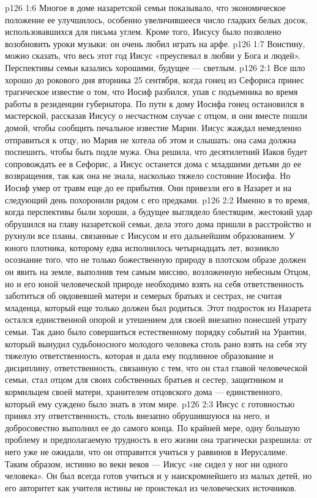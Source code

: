 \vs p126 1:6 Многое в доме назаретской семьи показывало, что экономическое положение ее улучшилось, особенно увеличившееся число гладких белых досок, использовавшихся для письма углем. Кроме того, Иисусу было позволено возобновить уроки музыки: он очень любил играть на арфе.
\vs p126 1:7 \pc Воистину, можно сказать, что весь этот год Иисус «преуспевал в любви у Бога и людей». Перспективы семьи казались хорошими, будущее --- светлым.
\vs p126 2:1 Все шло хорошо до рокового дня вторника 25 сентября, когда гонец из Сефориса принес трагическое известие о том, что Иосиф разбился, упав с подъемника во время работы в резиденции губернатора. По пути к дому Иосифа гонец остановился в мастерской, рассказав Иисусу о несчастном случае с отцом, и они вместе пошли домой, чтобы сообщить печальное известие Марии. Иисус жаждал немедленно отправиться к отцу, но Мария не хотела об этом и слышать: она сама должна поспешить, чтобы быть подле мужа. Она решила, что десятилетний Иаков будет сопровождать ее в Сефорис, а Иисус останется дома с младшими детьми до ее возвращения, так как она не знала, насколько тяжело состояние Иосифа. Но Иосиф умер от травм еще до ее прибытия. Они привезли его в Назарет и на следующий день похоронили рядом с его предками.
\vs p126 2:2 \pc Именно в то время, когда перспективы были хороши, а будущее выглядело блестящим, жестокий удар обрушился на главу назаретской семьи, дела этого дома пришли в расстройство и рухнули все планы, связанные с Иисусом и его дальнейшим образованием. У юного плотника, которому едва исполнилось четырнадцать лет, возникло осознание того, что не только божественную природу в плотском образе должен он явить на земле, выполнив тем самым миссию, возложенную небесным Отцом, но и его юной человеческой природе необходимо взять на себя ответственность заботиться об овдовевшей матери и семерых братьях и сестрах, не считая младенца, который еще только должен был родиться. Этот подросток из Назарета остался единственной опорой и утешением для своей внезапно понесшей утрату семьи. Так дано было совершиться естественному порядку событий на Урантии, который вынудил судьбоносного молодого человека столь рано взять на себя эту тяжелую ответственность, которая и дала ему подлинное образование и дисциплину, ответственность, связанную с тем, что он стал главой человеческой семьи, стал отцом для своих собственных братьев и сестер, защитником и кормильцем своей матери, хранителем отцовского дома --- единственного, который ему суждено было знать в этом мире.
\vs p126 2:3 Иисус с готовностью принял эту ответственность, столь внезапно обрушившуюся на него, и добросовестно выполнил ее до самого конца. По крайней мере, одну большую проблему и предполагаемую трудность в его жизни она трагически разрешила: от него уже не ожидали, что он отправится учиться у раввинов в Иерусалиме. Таким образом, истинно во веки веков --- Иисус «не сидел у ног ни одного человека». Он был всегда готов учиться и у наискромнейшего из малых детей, но его авторитет как учителя истины не проистекал из человеческих источников.
